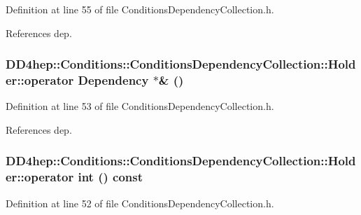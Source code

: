 Definition at line 55 of file ConditionsDependencyCollection.h.

References dep.\hypertarget{struct_d_d4hep_1_1_conditions_1_1_conditions_dependency_collection_1_1_holder_ae43b3cf1f6220bcea19b735766b017b0}{
\subsubsection[{operator Dependency $\ast$\&}]{\setlength{\rightskip}{0pt plus 5cm}DD4hep::Conditions::ConditionsDependencyCollection::Holder::operator {\bf Dependency} $\ast$\& ()}}
\label{struct_d_d4hep_1_1_conditions_1_1_conditions_dependency_collection_1_1_holder_ae43b3cf1f6220bcea19b735766b017b0}


Definition at line 53 of file ConditionsDependencyCollection.h.

References dep.\hypertarget{struct_d_d4hep_1_1_conditions_1_1_conditions_dependency_collection_1_1_holder_a93a5071aba32e3d019137f74cd320d3c}{
\subsubsection[{operator int}]{\setlength{\rightskip}{0pt plus 5cm}DD4hep::Conditions::ConditionsDependencyCollection::Holder::operator int () const}}
\label{struct_d_d4hep_1_1_conditions_1_1_conditions_dependency_collection_1_1_holder_a93a5071aba32e3d019137f74cd320d3c}


Definition at line 52 of file ConditionsDependencyCollection.h.


